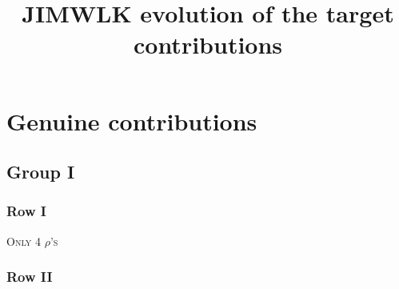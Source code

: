 \documentclass[9pt]{article}
\title{JIMWLK evolution of the target contributions}
\author{}
\date{}
\numberwithin{equation}{section}
\begin{document}
\maketitle
\section{Genuine contributions}
\subsection{Group I}
\subsubsection{Row I}
\textsc{Only 4 $\rho$'s} 
\subsubsection{Row II}
\end{document}

